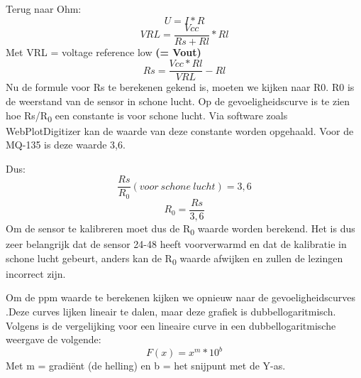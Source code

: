Terug naar Ohm:
\begin{equation}
    U = I * R
\end{equation}
\begin{equation}
    VRL = \frac{Vcc}{Rs + Rl} * Rl
\end{equation}
Met VRL = voltage reference low \textbf{(= Vout)}
\begin{equation}
    Rs = \frac{Vcc * Rl}{VRL} - Rl
\end{equation}
Nu de formule voor Rs te berekenen gekend is, moeten we kijken naar R0. R0 is de weerstand van de sensor in schone lucht. Op de gevoeligheidscurve
is te zien hoe Rs/R\textsubscript{0} een constante is voor schone lucht. Via software zoals WebPlotDigitizer
kan de waarde van deze constante worden opgehaald. Voor de MQ-135 is deze waarde 3,6.

Dus:
\begin{equation}
    \frac{Rs}{R_0}(voor\ schone\ lucht) = 3,6
\end{equation}
\begin{equation}
    R_0 = \frac{Rs}{3,6}
\end{equation}
Om de sensor te kalibreren moet dus de R\textsubscript{0} waarde worden berekend. Het is dus zeer belangrijk dat de sensor 24-48 heeft voorverwarmd en dat de kalibratie in schone lucht gebeurt, anders kan de R\textsubscript{0} waarde afwijken en zullen de lezingen incorrect zijn.

Om de ppm waarde te berekenen kijken we opnieuw naar de gevoeligheidscurves
.Deze curves lijken lineair te dalen, maar deze grafiek is dubbellogaritmisch. Volgens 
is de vergelijking voor een lineaire curve in een dubbellogaritmische weergave de volgende:
\begin{equation}
    F(x) = x^{m} * 10^{b}
\end{equation}
Met m = gradiënt (de helling) en b = het snijpunt met de Y-as.

